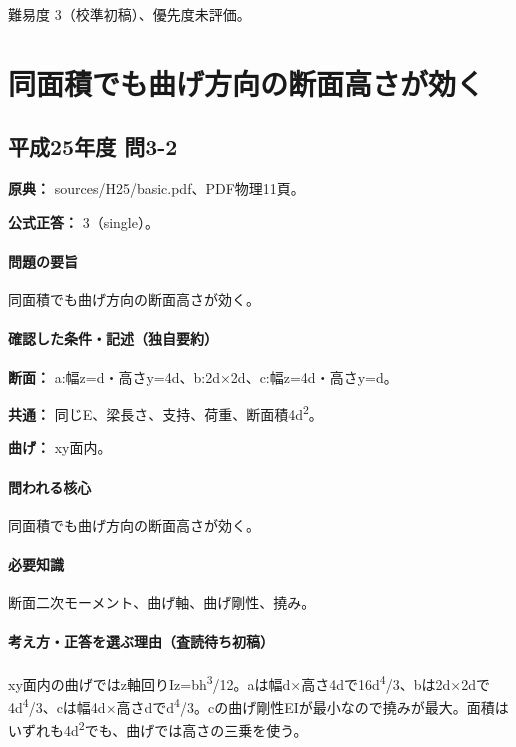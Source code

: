 \par 難易度 3（校準初稿）、優先度未評価。

\section{同面積でも曲げ方向の断面高さが効く}

\subsection{平成25年度 問3-2}
\label{q:h25-reg-basic-3-2}

\noindent\textbf{原典：} sources/H25/basic.pdf、PDF物理11頁。

\textbf{公式正答：} 3（single）。

\paragraph{問題の要旨} 同面積でも曲げ方向の断面高さが効く。

\paragraph{確認した条件・記述（独自要約）}\mbox{}\par

\noindent\textbf{断面：} a:幅z=\allowbreak{}d・高さy=\allowbreak{}4d、b:2d×2d、c:幅z=\allowbreak{}4d・高さy=\allowbreak{}d。\par

\noindent\textbf{共通：} 同じE、梁長さ、支持、荷重、断面積4d\textsuperscript{2}。\par

\noindent\textbf{曲げ：} xy面内。\par

\paragraph{問われる核心} 同面積でも曲げ方向の断面高さが効く。

\paragraph{必要知識} 断面二次モーメント、曲げ軸、曲げ剛性、撓み。

\paragraph{考え方・正答を選ぶ理由（査読待ち初稿）} xy面内の曲げではz軸回りIz=\allowbreak{}bh\textsuperscript{3}/12。aは幅d×高さ4dで16d\textsuperscript{4}/3、bは2d×2dで4d\textsuperscript{4}/3、cは幅4d×高さdでd\textsuperscript{4}/3。cの曲げ剛性EIが最小なので撓みが最大。面積はいずれも4d\textsuperscript{2}でも、曲げでは高さの三乗を使う。

